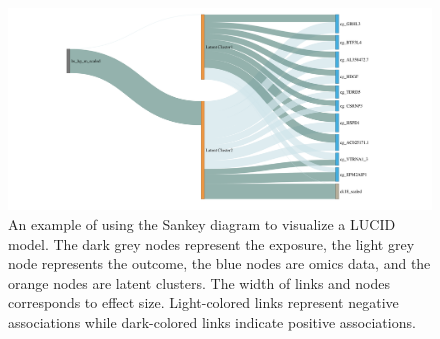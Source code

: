 \begin{figure}[]
    \centering
    \includegraphics[width = \textwidth]{figures/fig3.pdf}
    \caption{An example of using the Sankey diagram to visualize a LUCID model. The dark grey nodes represent the exposure, the light grey node represents the outcome, the blue nodes are omics data, and the orange nodes are latent clusters. The width of links and nodes corresponds to effect size. Light-colored links represent negative associations while dark-colored links indicate positive associations.}
    \label{fig3}
\end{figure}
